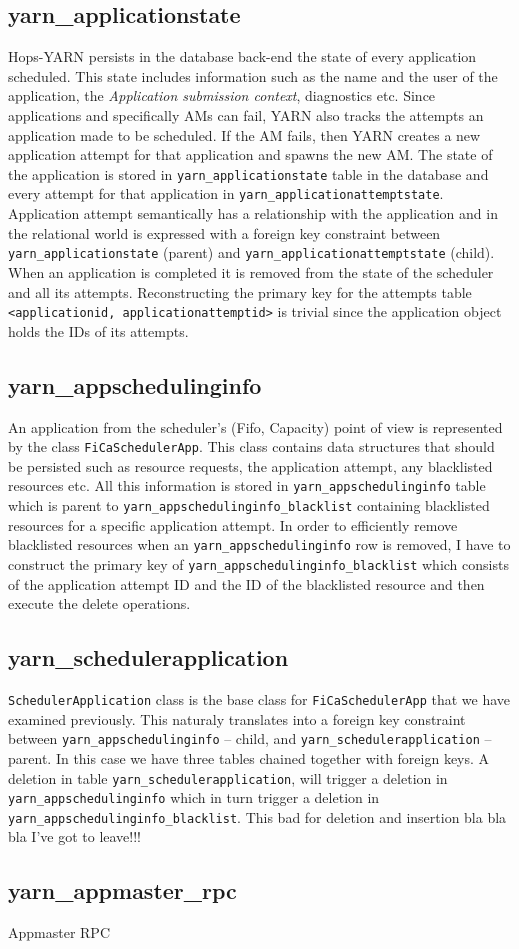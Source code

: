 \subsection{yarn\_applicationstate}
\label{ssec:impl_fk_appstate}
Hops-YARN persists in the database back-end the state of every
application scheduled. This state includes information such as the
name and the user of the application, the \emph{Application submission
  context}, diagnostics etc. Since applications and specifically AMs
can fail, YARN also tracks the attempts an application made to be scheduled.
If the AM fails, then YARN creates a new application attempt
for that application and spawns the new AM. The state of the
application is stored in \texttt{yarn\_applicationstate} table in the
database and every attempt for that application in
\texttt{yarn\_applicationattemptstate}. Application attempt
semantically has a relationship with the application and in the
relational world is expressed with a foreign key constraint
between \texttt{yarn\_applicationstate} (parent) and
\texttt{yarn\_applicationattemptstate} (child). When an application
is completed it is removed from the state of the scheduler and all
its attempts. Reconstructing the primary key for the attempts table
\texttt{<applicationid, applicationattemptid>} is trivial since the
application object holds the IDs of its attempts.

\subsection{yarn\_appschedulinginfo}
\label{ssec:impl_fk_appschedulinginfo}
An application from the scheduler's (Fifo, Capacity) point of view is
represented by the class \texttt{FiCaSchedulerApp}. This class
contains data structures that should be persisted such as resource
requests, the application attempt, any blacklisted resources etc. All
this information is stored in \texttt{yarn\_appschedulinginfo} table
which is parent to \texttt{yarn\_appschedulinginfo\_blacklist}
containing blacklisted resources for a specific application
attempt. In order to efficiently remove blacklisted resources when an
\texttt{yarn\_appschedulinginfo} row is removed, I have to construct
the primary key of \texttt{yarn\_appschedulinginfo\_blacklist} which
consists of the application attempt ID and the ID of the blacklisted
resource and then execute the delete operations.

\subsection{yarn\_schedulerapplication}
\label{ssec:impl_fk_schedulerapp}
\texttt{SchedulerApplication} class is the base class for
\texttt{FiCaSchedulerApp} that we have examined previously. This
naturaly translates into a foreign key constraint between
\texttt{yarn\_appschedulinginfo} -- child, and
\texttt{yarn\_schedulerapplication} -- parent. In this case we have
three tables chained together with foreign keys. A deletion in table 
\texttt{yarn\_schedulerapplication}, will trigger a deletion in
\texttt{yarn\_appschedulinginfo} which in turn trigger a deletion in
\texttt{yarn\_appschedulinginfo\_blacklist}. This bad for deletion and
insertion bla bla bla I've got to leave!!!

\subsection{yarn\_appmaster\_rpc}
\label{ssec:impl_fk_appmaster_rpc}
Appmaster RPC
